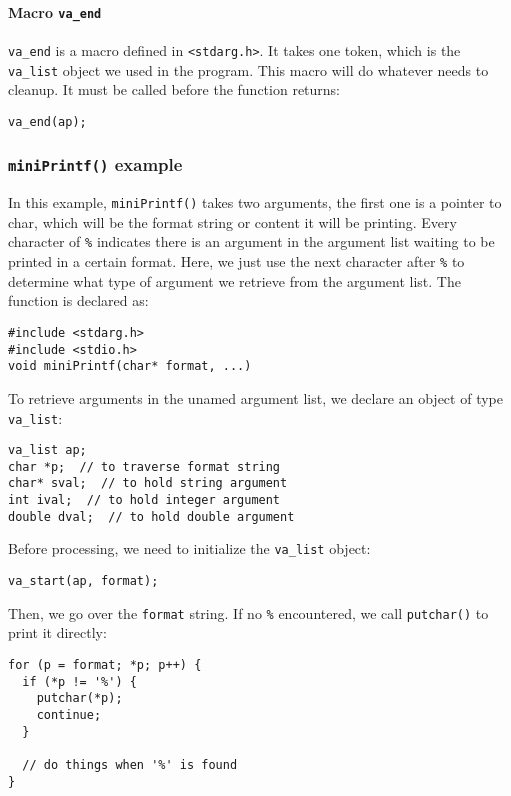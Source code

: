 \documentclass[12pt]{article}
\begin{document}
\paragraph{Macro \texttt{va\_end}}
\label{sec:orgdb56803}
\texttt{va\_end} is a macro defined in \texttt{<stdarg.h>}. It takes one token, which is the \texttt{va\_list} object we used in the program. This macro will do whatever needs to cleanup. It must be called before the function returns:
\begin{verbatim}
va_end(ap);
\end{verbatim}

\subsubsection{\texttt{miniPrintf()} example}
\label{sec:org0fef06a}
In this example, \texttt{miniPrintf()} takes two arguments, the first one is a pointer to char, which will be the format string or content it will be printing. Every character of \texttt{\%} indicates there is an argument in the argument list waiting to be printed in a certain format. Here, we just use the next character after \texttt{\%} to determine what type of argument we retrieve from the argument list. The function is declared as:
\begin{verbatim}
#include <stdarg.h>
#include <stdio.h>
void miniPrintf(char* format, ...)
\end{verbatim}
To retrieve arguments in the unamed argument list, we declare an object of type \texttt{va\_list}:
\begin{verbatim}
va_list ap;
char *p;  // to traverse format string
char* sval;  // to hold string argument
int ival;  // to hold integer argument
double dval;  // to hold double argument
\end{verbatim}
Before processing, we need to initialize the \texttt{va\_list} object:
\begin{verbatim}
va_start(ap, format);
\end{verbatim}
Then, we go over the \texttt{format} string. If no \texttt{\%} encountered, we call \texttt{putchar()} to print it directly:
\begin{verbatim}
for (p = format; *p; p++) {
  if (*p != '%') {
    putchar(*p);
    continue;
  }

  // do things when '%' is found
}
\end{verbatim}
\end{document}
